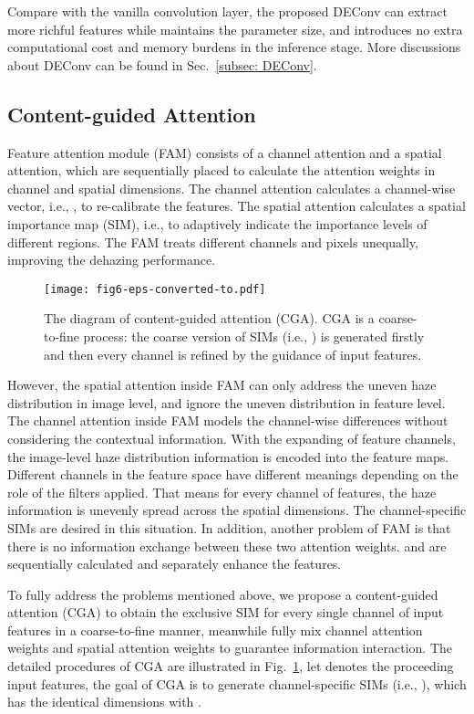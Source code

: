 \documentclass[lettersize,journal]{IEEEtran}
\begin{document}
Compare with the vanilla convolution layer, the proposed DEConv can extract more richful features while maintains the parameter size, and introduces no extra computational cost and memory burdens in the inference stage.
More discussions about DEConv can be found in Sec.~\ref{subsec: DEConv}.

\subsection{Content-guided Attention}

Feature attention module (FAM) consists of a channel attention and a spatial attention, which are sequentially placed to calculate the attention weights in channel and spatial dimensions.
The channel attention calculates a channel-wise vector, i.e., , to re-calibrate the features.
The spatial attention calculates a spatial importance map (SIM), i.e.,  to adaptively indicate the importance levels of different regions.
The FAM treats different channels and pixels unequally, improving the dehazing performance.

\begin{figure}[!t]
	\centering
	\texttt{[image: fig6-eps-converted-to.pdf]}
	\caption{The diagram of content-guided attention (CGA). CGA is a coarse-to-fine process: the coarse version of SIMs (i.e., ) is generated firstly and then every channel is refined by the guidance of input features.}
	\label{fig:fig6}
\end{figure}

However, the spatial attention inside FAM can only address the uneven haze distribution in image level, and ignore the uneven distribution in feature level.
The channel attention inside FAM models the channel-wise differences without considering the contextual information.
With the expanding of feature channels, the image-level haze distribution information is encoded into the feature maps.
Different channels in the feature space have different meanings depending on the role of the filters applied.
That means for every channel of features, the haze information is unevenly spread across the spatial dimensions.
The channel-specific SIMs are desired in this situation. 
In addition, another problem of FAM is that there is no information exchange between these two attention weights.
 and  are sequentially calculated and separately enhance the features.

To fully address the problems mentioned above, we propose a content-guided attention (CGA) to obtain the exclusive SIM for every single channel of input features in a coarse-to-fine manner, meanwhile fully mix channel attention weights and spatial attention weights to guarantee information interaction.
The detailed procedures of CGA are illustrated in Fig.~\ref{fig:fig6}, let  denotes the proceeding input features, the goal of CGA is to generate channel-specific SIMs (i.e., ), which has the identical dimensions with .
\end{document}
